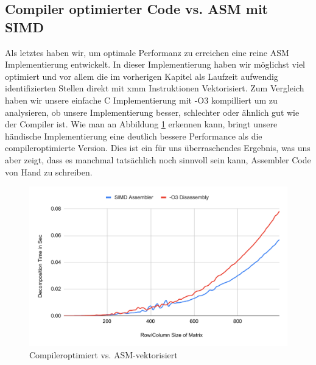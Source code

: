 \documentclass[course=erap]{aspdoc}
\begin{document}
\subsection{Compiler optimierter Code vs. ASM mit SIMD}
Als letztes haben wir, um optimale Performanz zu erreichen eine reine ASM Implementierung entwickelt. In dieser 
Implementierung haben wir möglichst viel optimiert und vor allem die im vorherigen Kapitel als Laufzeit aufwendig
identifizierten Stellen direkt mit xmm Instruktionen Vektorisiert. Zum Vergleich haben wir unsere einfache C 
Implementierung mit -O3 kompilliert um zu analysieren, ob unsere Implementierung besser, schlechter oder ähnlich gut wie 
der Compiler ist. Wie man an Abbildung \ref{CvsASM} erkennen kann, bringt unsere händische Implementierung eine deutlich 
bessere Performance als die compileroptimierte Version. Dies ist ein für uns überraschendes Ergebnis, was uns aber zeigt, 
dass es manchmal tatsächlich noch sinnvoll sein kann, Assembler Code von Hand zu schreiben.
  \begin{figure}[H]
  \begin{center}
  \caption{Compileroptimiert vs. ASM-vektorisiert} 
  \label{CvsASM}
  \includegraphics[width = 0.8\linewidth]{CvsASM.pdf}
  \end{center}
  \end{figure}



\end{document}
